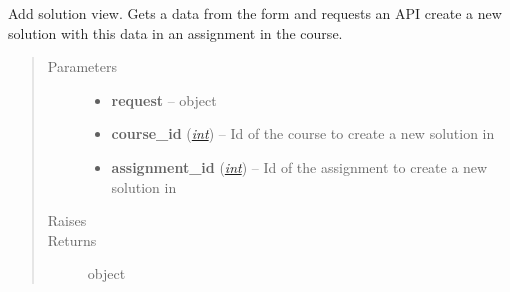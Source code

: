 \documentclass[letterpaper,10pt,english]{sphinxmanual}
\begin{document}
\begin{fulllineitems}
\label{web_portal:core.courses.views.add_solution}
Add solution view. Gets a data from the form and requests an API create a
new solution with this data in an assignment in the course.
\begin{quote}\begin{description}
\item[{Parameters}] \leavevmode\begin{itemize}
\item {} 
\textbf{request} --  object

\item {} 
\textbf{course\_id} (\href{http://docs.python.org/library/functions.html\#int}{\emph{int}}) -- Id of the course to create a new solution in

\item {} 
\textbf{assignment\_id} (\href{http://docs.python.org/library/functions.html\#int}{\emph{int}}) -- Id of the assignment to create a new solution in

\end{itemize}

\item[{Raises}] \leavevmode
{}

\item[{Returns}] \leavevmode
{} object

\end{description}\end{quote}

\end{fulllineitems}

\end{document}
